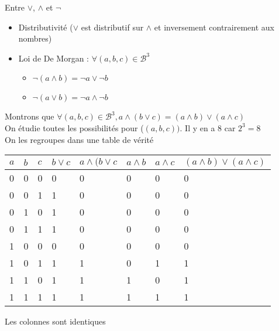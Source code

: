 \begin{prop}
    Entre $\lor$, $\land$ et $\lnot$
    \begin{itemize}
        \item Distributivité ($\lor$ est distributif sur $\land$ et inversement contrairement aux nombres)
        \item Loi de De Morgan : $\forall (a,b,c) \in \mathcal{B}^3$
            \begin{itemize}
                \item $\lnot(a\land b)= \lnot a \lor \lnot b$
                \item $\lnot(a\lor b)= \lnot a \land \lnot b$
            \end{itemize}
    \end{itemize}
\end{prop}

\begin{dem}
    Montrons que $\forall (a,b,c) \in \mathcal{B}^3, a\land(b\lor c)=(a\land b)\lor (a \land c)$ \\
    On étudie toutes les possibilités pour ($(a,b,c))$. Il y en a $8$ car $2^3=8$ \\
    On les regroupes dans une table de vérité \\

        \begin{tabular}{|l|l|l|l|l|l|l|l|}
        \hline
        $a$ & $b$ & $c$ & $b\lor c$ & $a\land (b\lor c$ & $a\land b$ & $a \land c$ & $(a\land b)\lor (a\land c)$ \\ \hline
        0   & 0   & 0   & 0         & 0                 & 0          & 0           & 0                           \\ \hline
        0   & 0   & 1   & 1         & 0                 & 0          & 0           & 0                           \\ \hline
        0   & 1   & 0   & 1         & 0                 & 0          & 0           & 0                           \\ \hline
        0   & 1   & 1   & 1         & 0                 & 0          & 0           & 0                           \\ \hline
        1   & 0   & 0   & 0         & 0                 & 0          & 0           & 0                           \\ \hline
        1   & 0   & 1   & 1         & 1                 & 0          & 1           & 1                           \\ \hline
        1   & 1   & 0   & 1         & 1                 & 1          & 0           & 1                           \\ \hline
        1   & 1   & 1   & 1         & 1                 & 1          & 1           & 1                            \\ \hline
        \end{tabular}


    Les colonnes sont identiques \\
\end{dem}

